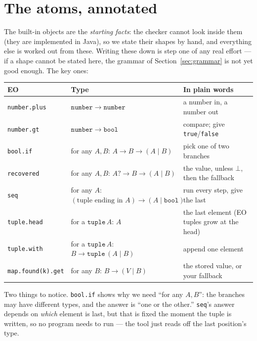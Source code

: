 \documentclass[10pt]{article}
\newcommand{\ty}[1]{\mathtt{#1}}     %
\newcommand{\arr}{\to}               %
\newcommand{\opt}{\mathbin{?}}       %
\begin{document}
\section{The atoms, annotated}\label{sec:atoms}

The built-in objects are the \emph{starting facts}: the checker cannot look
inside them (they are implemented in Java), so we state their shapes by hand,
and everything else is worked out from these. Writing these down is step one of
any real effort --- if a shape cannot be stated here, the grammar of Section~\ref{sec:grammar}
is not yet good enough. The key ones:

\begin{center}\small
\renewcommand{\arraystretch}{1.15}
\begin{tabular}{@{}lll@{}}
\toprule
\textbf{EO} & \textbf{Type} & \textbf{In plain words} \\
\midrule
\verb|number.plus|      & $\ty{number}\arr\ty{number}$                                   & a number in, a number out \\
\verb|number.gt|        & $\ty{number}\arr\ty{bool}$                                     & compare; give \verb|true|/\verb|false| \\
\verb|bool.if|          & for any $A,B$: $A\arr B\arr (A\mid B)$                          & pick one of two branches \\
\verb|recovered|        & for any $A,B$: $A\opt\arr B\arr (A\mid B)$                      & the value, unless $\bot$, then the fallback \\
\verb|seq|              & for any $A$: $(\text{tuple ending in } A)\arr (A\mid\ty{bool})$   & run every step, give the last \\
\verb|tuple.head|       & for a $\ty{tuple}\,A$: $A$                                      & the last element (EO tuples grow at the head) \\
\verb|tuple.with|       & for a $\ty{tuple}\,A$: $B\arr \ty{tuple}\,(A\mid B)$       & append one element \\
\verb|map.found(k).get| & for any $B$: $B\arr (V\mid B)$                                  & the stored value, or your fallback \\
\bottomrule
\end{tabular}
\end{center}

\noindent
Two things to notice. \verb|bool.if| shows why we need ``for any $A,B$'':
the branches may have different types, and the answer is ``one or the other.''
\verb|seq|'s answer depends on \emph{which} element is last, but that is fixed
the moment the tuple is written, so no program needs to run --- the tool just
reads off the last position's type.
\end{document}
